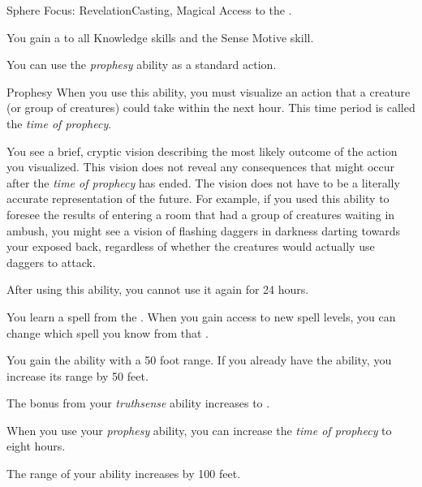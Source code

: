     \begin{feat}{Sphere Focus: Revelation}{Casting, Magical}
        \featpre Access to the  .

         You gain a   to all Knowledge skills and the Sense Motive skill.

         You can use the \textit{prophesy} ability as a standard action.
        \begin{freeability}{Prophesy}
            When you use this ability, you must visualize an action that a creature (or group of creatures) could take within the next hour.
            This time period is called the \textit{time of prophecy}.

            You see a brief, cryptic vision describing the most likely outcome of the action you visualized.
            This vision does not reveal any consequences that might occur after the \textit{time of prophecy} has ended.
            The vision does not have to be a literally accurate representation of the future.
            For example, if you used this ability to foresee the results of entering a room that had a group of creatures waiting in ambush, you might see a vision of flashing daggers in darkness darting towards your exposed back, regardless of whether the creatures would actually use daggers to attack.

            After using this ability, you cannot use it again for 24 hours.
        \end{freeability}

         You learn a spell from the  .
        When you gain access to new spell levels, you can change which spell you know from that .

         You gain the  ability with a 50 foot range.
        If you already have the  ability, you increase its range by 50 feet.

         The bonus from your \textit{truthsense} ability increases to .

         When you use your \textit{prophesy} ability, you can increase the \textit{time of prophecy} to eight hours.

         The range of your  ability increases by 100 feet.
    \end{feat}

